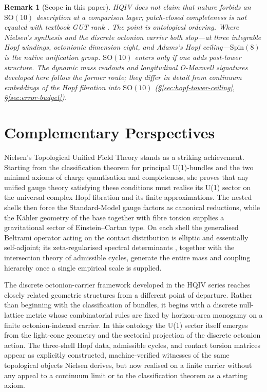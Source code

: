 \documentclass[11pt]{amsart}
\newtheorem{remark}[theorem]{Remark}
\begin{document}
\begin{remark}[Scope in this paper]
\label{rem:so8-so10-scope}
HQIV does not claim that nature \emph{forbids} an $\mathrm{SO}(10)$ description at a comparison layer; patch-closed completeness is not equated with textbook GUT rank \cite{georgi1974}. The point is ontological ordering. Where Nielsen's synthesis and the discrete octonion carrier both stop---at three integrable Hopf windings, octonionic dimension eight, and Adams's Hopf ceiling---$\mathrm{Spin}(8)$ is the native unification group. $\mathrm{SO}(10)$ enters only if one \emph{adds} post-tower structure. The dynamic mass readouts and longitudinal O-Maxwell signatures developed here follow the former route; they differ in detail from continuum embeddings of the Hopf fibration into $\mathrm{SO}(10)$ (\S\ref{sec:hopf-tower-ceiling}, \S\ref{sec:error-budget}).
\end{remark}

\section{Complementary Perspectives}

Nielsen's Topological Unified Field Theory stands as a striking achievement. Starting from the classification theorem for principal U(1)-bundles \cite{Milnor1956,Milnor1956b,MilnorStasheff1974,steenrod1951} and the two minimal axioms of charge quantisation and completeness, she proves that any unified gauge theory satisfying these conditions must realise its U(1) sector on the universal complex Hopf fibration and its finite approximations. The nested shells then force the Standard-Model gauge factors as canonical reductions, while the Kähler geometry of the base together with fibre torsion supplies a gravitational sector of Einstein--Cartan type. On each shell the generalised Beltrami operator acting on the contact distribution is elliptic and essentially self-adjoint; its zeta-regularised spectral determinants \cite{minakshisundaram1949,RaySinger1971,Cheeger1979,Muller1978,witten1979}, together with the intersection theory of admissible cycles, generate the entire mass and coupling hierarchy once a single empirical scale is supplied.

The discrete octonion-carrier framework developed in the HQIV series reaches closely related geometric structures from a different point of departure. Rather than beginning with the classification of bundles, it begins with a discrete null-lattice metric whose combinatorial rules are fixed by horizon-area monogamy on a finite octonion-indexed carrier. In this ontology the U(1) sector itself emerges from the light-cone geometry and the sectorial projection of the discrete octonion action. The three-shell Hopf data, admissible cycles, and contact torsion matrices appear as explicitly constructed, machine-verified witnesses of the same topological objects Nielsen derives, but now realised on a finite carrier without any appeal to a continuum limit or to the classification theorem as a starting axiom.
\end{document}
